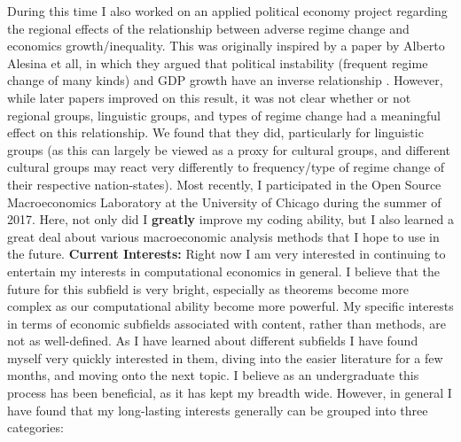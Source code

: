 \documentclass[12pt]{article}
\begin{document}
\newline\newline
During this time I also worked on an applied political economy project regarding the regional effects of the relationship between adverse regime change and economics growth/inequality. This was originally inspired by a paper by Alberto Alesina et all, in which they argued that political instability (frequent regime change of many kinds) and GDP growth have an inverse relationship \cite{ref2:2}. However, while later papers improved on this result, it was not clear whether or not regional groups, linguistic groups, and types of regime change had a meaningful effect on this relationship. We found that they did, particularly for linguistic groups (as this can largely be viewed as a proxy for cultural groups, and different cultural groups may react very differently to frequency/type of regime change of their respective nation-states).
\newline\newline
Most recently, I participated in the Open Source Macroeconomics Laboratory at the University of Chicago during the summer of 2017. Here, not only did I \textbf{greatly} improve my coding ability, but I also learned a great deal about various macroeconomic analysis methods that I hope to use in the future.
\newline\newline
\textbf{Current Interests:}
\newline\newline
Right now I am very interested in continuing to entertain my interests in computational economics in general. I believe that the future for this subfield is very bright, especially as theorems become more complex as our computational ability become more powerful. My specific interests in terms of economic subfields associated with content, rather than methods, are not as well-defined. As I have learned about different subfields I have found myself very quickly interested in them, diving into the easier literature for a few months, and moving onto the next topic. I believe as an undergraduate this process has been beneficial, as it has kept my breadth wide. However, in general I have found that my long-lasting interests generally can be grouped into three categories:
\newline
\end{document}
